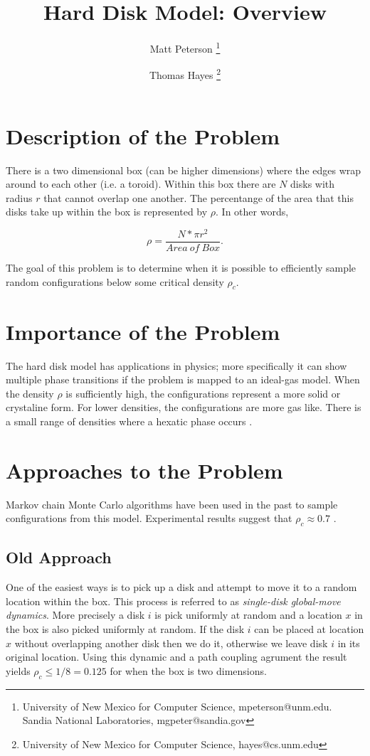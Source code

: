\documentclass[a4paper,11pt]{article}
\title{Hard Disk Model: Overview}
\author{Matt Peterson \thanks{University of New Mexico for Computer Science, mpeterson@unm.edu. Sandia National Laboratories, mgpeter@sandia.gov} \and Thomas Hayes \thanks{University of New Mexico for Computer Science, hayes@cs.unm.edu}}
\begin{document}
\maketitle

\section*{Description of the Problem}
There is a two dimensional box (can be higher dimensions) where the edges wrap around to each other (i.e. a toroid).  Within this box there are $N$ disks with radius $r$ that cannot overlap one another.  The percentange of the area that this disks take up within the box is represented by $\rho$.  In other words,

\begin{displaymath}
  \rho = \frac{N*\pi r^2}{Area\ of\ Box}.
\end{displaymath}

The goal of this problem is to determine when it is possible to efficiently sample random configurations below some critical density $\rho_c$.

\section*{Importance of the Problem}

The hard disk model has applications in physics; more specifically it can show multiple phase transitions if the problem is mapped to an ideal-gas model.  When the density $\rho$ is sufficiently high, the configurations represent a more solid or crystaline form.  For lower densities, the configurations are more gas like.  There is a small range of densities where a hexatic phase occurs \cite{Bernard}.

\section*{Approaches to the Problem}

Markov chain Monte Carlo algorithms have been used in the past to sample configurations from this model.  Experimental results suggest that $\rho_c \approx 0.7$ \cite{Mak}\cite{Piasecki}.

\subsection*{Old Approach}

One of the easiest ways is to pick up a disk and attempt to move it to a random location within the box.  This process is referred to as \textit{single-disk global-move dynamics}.  More precisely a disk $i$ is pick uniformly at random and a location $x$ in the box is also picked uniformly at random.  If the disk $i$ can be placed at location $x$ without overlapping another disk then we do it, otherwise we leave disk $i$ in its original location.  Using this dynamic and a path coupling agrument the result yields $\rho_c \le 1/8 = 0.125$ \cite{Kannan} for when the box is two dimensions.
\end{document}
